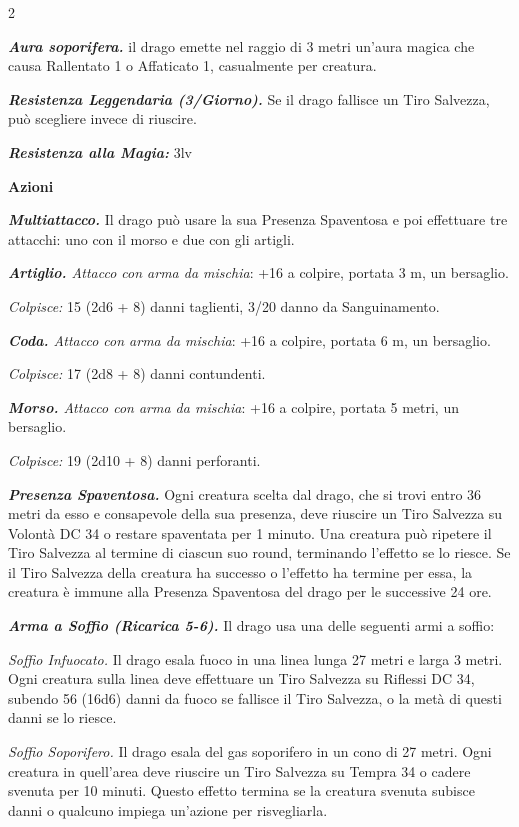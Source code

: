 \begin{multicols}{2}
{\emph{\textbf{Aura soporifera.}} il drago emette nel raggio di 3 metri un'aura magica che causa Rallentato 1 o Affaticato 1, casualmente per creatura.

\emph{\textbf{Resistenza Leggendaria (3/Giorno).}} Se il drago fallisce un Tiro Salvezza, può scegliere invece di riuscire.

\emph{\textbf{Resistenza alla Magia:}} 3lv

\textbf{Azioni}

\emph{\textbf{Multiattacco.}} Il drago può usare la sua Presenza Spaventosa e poi effettuare tre attacchi: uno con il morso e due con gli artigli.

\emph{\textbf{Artiglio.} Attacco con arma da mischia}: +16 a colpire, portata 3 m, un bersaglio.

\emph{Colpisce:} 15 (2d6 + 8) danni taglienti, 3/20 danno da Sanguinamento.

\emph{\textbf{Coda.} Attacco con arma da mischia}: +16 a colpire, portata 6 m, un bersaglio.

\emph{Colpisce:} 17 (2d8 + 8) danni contundenti.

\emph{\textbf{Morso.} Attacco con arma da mischia}: +16 a colpire, portata 5 metri, un bersaglio.

\emph{Colpisce:} 19 (2d10 + 8) danni perforanti.

\emph{\textbf{Presenza Spaventosa.}} Ogni creatura scelta dal drago, che si trovi entro 36 metri da esso e consapevole della sua presenza, deve riuscire un Tiro Salvezza su Volontà DC 34 o restare spaventata per 1 minuto. Una creatura può ripetere il Tiro Salvezza al termine di ciascun suo round, terminando l'effetto se lo riesce. Se il Tiro Salvezza della creatura ha successo o l'effetto ha termine per essa, la creatura è immune alla Presenza Spaventosa del drago per le successive 24 ore.

\emph{\textbf{Arma a Soffio (Ricarica 5-6).}} Il drago usa una delle seguenti armi a soffio:

\emph{Soffio Infuocato.} Il drago esala fuoco in una linea lunga 27 metri e larga 3 metri. Ogni creatura sulla linea deve effettuare un Tiro Salvezza su Riflessi DC 34, subendo 56 (16d6) danni da fuoco se fallisce il Tiro Salvezza, o la metà di questi danni se lo riesce.

\emph{Soffio Soporifero.} Il drago esala del gas soporifero in un cono di 27 metri. Ogni creatura in quell'area deve riuscire un Tiro Salvezza su Tempra 34 o cadere svenuta per 10 minuti. Questo effetto termina se la creatura svenuta subisce danni o qualcuno impiega un'azione per risvegliarla.

}
\end{multicols}
